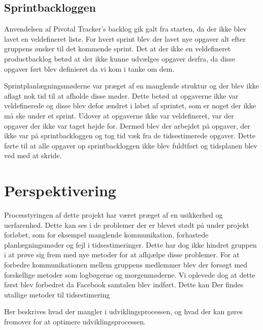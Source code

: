 \section{Sprintbackloggen}
Anvendelsen af Pivotal Tracker's backlog gik galt fra starten, da der ikke blev lavet en veldefineret liste. For hvert sprint blev der lavet nye opgaver alt efter gruppens ønsker til det kommende sprint. Det at der ikke en veldefineret productbacklog betød at der ikke kunne udvælges opgaver derfra, da disse opgaver ført blev definieret da vi kom i tanke om dem. \par
Sprintplanlægningsmøderne var præget af en manglende struktur og der blev ikke aflagt nok tid til at afholde disse møder. Dette betød at opgaverne ikke var veldefinerede og disse blev defor ændret i løbet af sprintet, som er noget der ikke må ske under et sprint. Udover at opgaverne ikke var veldefineret, var der opgaver der ikke var taget højde for. Dermed blev der arbejdet på opgaver, der ikke var på sprintbackloggen og tog tid væk fra de tidsestimerede opgaver. Dette førte til at alle opgaver op sprintbackloggen ikke blev fuldtført og tidsplanen blev ved med at skride.

\chapter{Perspektivering}
Processtyringen af dette projekt har været præget af en usikkerhed og uerfarenhed. Dette kan ses i de problemer der er blevet stødt på under projekt forløbet, som for eksempel manglende kommunikation, forhastede planlægningsmøder og fejl i tidsestimeringer. Dette har dog ikke hindret gruppen i at prøve sig frem med nye metoder for at afhjælpe disse problemer. 
For at forbedre kommunikationen mellem gruppens medlemmer blev der forsøgt med forskellige metoder som logbøgerne og morgenmøderne. Vi oplevede dog at dette først blev forbedret da Facebook samtalen blev indført. 
Dette kan 
Der findes utallige metoder til tidsestimering 

Her beskrives hvad der mangler i udviklingsprocessen, og hvad der kan gøres
fremover for at optimere udviklingsprocessen. 